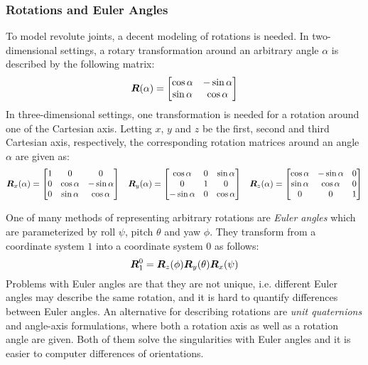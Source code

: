 			\subsubsection{Rotations and Euler Angles}
				To model revolute joints, a decent modeling of rotations is needed. In two-dimensional settings, a rotary transformation around an arbitrary angle \(\alpha\) is described by the following matrix:
				\begin{equation*}
					\bm{R}(\alpha) =
						\begin{bmatrix}
							\cos\alpha & -\sin\alpha \\
							\sin\alpha &  \cos\alpha
						\end{bmatrix}
				\end{equation*}
				In three-dimensional settings, one transformation is needed for a rotation around one of the Cartesian axis. Letting \(x\), \(y\) and \(z\) be the first, second and third Cartesian axis, respectively, the corresponding rotation matrices around an angle \(\alpha\) are given as:
				\begin{align*}
					\bm{R}_x(\alpha) =
						\begin{bmatrix}
							1 & 0          & 0           \\
							0 & \cos\alpha & -\sin\alpha \\
							0 & \sin\alpha &  \cos\alpha
						\end{bmatrix}
					&&
					\bm{R}_y(\alpha) =
						\begin{bmatrix}
							 \cos\alpha & 0 & \sin\alpha \\
							 0          & 1 & 0          \\
							-\sin\alpha & 0 & \cos\alpha
						\end{bmatrix}
					&&
					\bm{R}_z(\alpha) =
						\begin{bmatrix}
							\cos\alpha & -\sin\alpha & 0 \\
							\sin\alpha &  \cos\alpha & 0 \\
							0          &  0          & 1
						\end{bmatrix}
				\end{align*}

				One of many methods of representing arbitrary rotations are \emph{Euler angles} which are parameterized by roll \(\psi\), pitch \(\theta\) and yaw \(\phi\). They transform from a coordinate system \(1\) into a coordinate system \(0\) as follows:
				\begin{equation*}
					\bm{R}_1^0 = \bm{R}_z(\phi) \bm{R}_y(\theta) \bm{R}_x(\psi)
				\end{equation*}
				Problems with Euler angles are that they are not unique, i.e. different Euler angles may describe the same rotation, and it is hard to quantify differences between Euler angles. An alternative for describing rotations are \emph{unit quaternions} and angle-axis formulations, where both a rotation axis as well as a rotation angle are given. Both of them solve the singularities with Euler angles and it is easier to computer differences of orientations.

